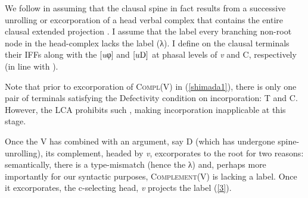 \documentclass[output=paper]{langsci/langscibook}
\begin{document}
We follow \citet{Shimada:2007} in assuming that the clausal spine in fact
results from a successive unrolling or excorporation of a head verbal complex
that contains the entire clausal extended projection
\parencite[cf.][]{Saito:2012}. I assume that the label every branching
non-root  node in the head-complex lacks the label (λ). I define on the clausal
terminals their \glspl{IFF} along with the [\emph{u}φ] and $[u\textup{D}]$ at
phasal levels of \emph{v} and C, respectively (in line with
\citealt{Roberts2010}).

\begin{exe}
	\ex

	\hfill
	\hfill
\label{shimada1}
\end{exe}

Note that prior to excorporation of \textsc{Compl}(V) in
(\ref{shimada1}), there is only one pair of terminals satisfying the
Defectivity condition on incorporation: T and C. However, the
\gls{LCA} prohibits such , making
incorporation inapplicable at this stage.

Once the V has combined with an argument, say D (which has
undergone spine-unrolling), its complement, headed by \emph{v},
excorporates to the root for two reasons: semantically, there is a
type-mismatch (hence the λ) and, perhaps more importantly for our
syntactic purposes, \textsc{Com\-ple\-ment}(V) is lacking
a label. Once it excorporates, the c-selecting head, \emph{v} projects
the label (\ref{3}).

\begin{exe}
	\ex
	\hfill
		\hfill
\label{3}
\end{exe}
\end{document}
